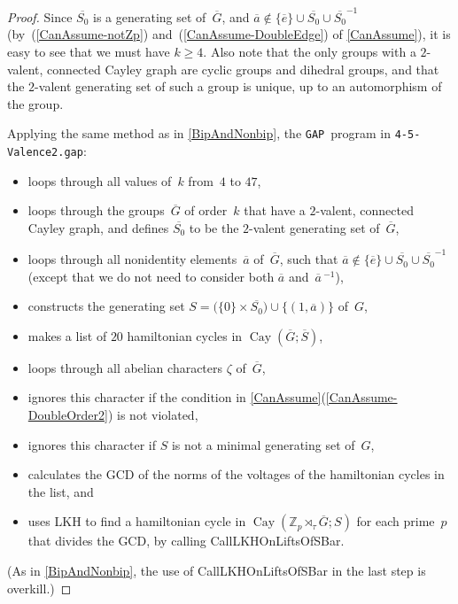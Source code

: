 \documentclass[]{amcjoucc}
\newcommand{\pref}[1]{(\ref{#1})}
\newcommand{\fullcref}[2]{\cref{#1}\pref{#1-#2}}
\theoremstyle{plain}
\theoremstyle{definition}
\theoremstyle{definition}
\newenvironment{justification}{\begingroup \renewcommand{\proofname}{Justification}\begin{proof}}{\end{proof}\endgroup}
\DeclareMathOperator{\Cay}{Cay}
\newcommand{\quot}{\overline}
\newcommand{\GAP}{\filename{GAP}}
\newcommand{\ZZ}{\mathbb{Z}}
\newcommand{\filename}[1]{\texttt{#1}}
\newcommand{\function}[1]{\textsf{#1}}
\begin{document}
\begin{justification}
Since $\quot{S_0}$ is a generating set of~$\quot G$, and $\quot a \notin \{\quot e\} \cup \quot{S_0} \cup \quot{S_0}^{-1}$ (by~\pref{CanAssume-notZp} and~\pref{CanAssume-DoubleEdge} of \cref{CanAssume}), it is easy to see that we must have $k \ge 4$. Also note that the only groups with a $2$-valent, connected Cayley graph are cyclic groups and dihedral groups, and that the $2$-valent generating set of such a group is unique, up to an automorphism of the group.

Applying the same method as in \cref{BipAndNonbip}, the \GAP\ program in \filename{4-5-Valence2.gap}:
	\begin{itemize}
	\item loops through all values of~$k$ from~$4$ to $47$,
	\item loops through the groups~$\quot G$ of order~$k$ that have a $2$-valent, connected Cayley graph, and defines $\quot{S_0}$ to be the $2$-valent generating set of~$\quot G$,
	\item loops through all nonidentity elements~$\quot a$ of~$\quot G$, such that $\quot a \notin \{\quot e\} \cup \quot{S_0} \cup \quot{S_0}^{-1}$ (except that we do not need to consider both $\quot a$ and~$\quot a\,^{-1}$),
	\item constructs the generating set $S = \bigl( \{0\} \times \quot{S_0} \bigr) \cup \{(1, \quot a)\}$ of~$G$,
	\item makes a list of $20$ hamiltonian cycles in $\Cay(\quot G; \quot S)$,
	\item loops through all abelian characters $\zeta$ of~$\quot G$,
	\item ignores this character if the condition in \fullcref{CanAssume}{DoubleOrder2} is not violated,
	\item ignores this character if $S$ is not a minimal generating set of~$G$,
	\item calculates the GCD of the norms of the voltages of the hamiltonian cycles in the list,
	and
	\item uses \function{LKH} to find a hamiltonian cycle in $\Cay(\ZZ_p \rtimes_\tau \quot G; S)$ for each prime~$p$ that divides the GCD, by calling \function{CallLKHOnLiftsOfSBar}. 
	\end{itemize}
(As in \cref{BipAndNonbip}, the use of \function{CallLKHOnLiftsOfSBar} in the last step is overkill.)	
\end{justification}
\end{document}
